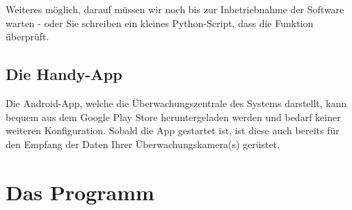 \documentclass[12pt,a4paper]{scrreprt}
\begin{document}
Weiteres möglich, darauf müssen wir noch bis zur Inbetriebnahme der Software warten - oder Sie schreiben ein kleines Python-Script, dass die Funktion überprüft.  

\section{Die Handy-App}
Die Android-App, welche die Überwachungszentrale des Systems darstellt, kann bequem aus dem Google Play Store heruntergeladen werden und bedarf keiner weiteren Konfiguration. Sobald die App gestartet ist, ist diese auch bereits für den Empfang der Daten Ihrer Überwachungskamera(s) gerüstet.

\chapter{Das Programm}
\end{document}
